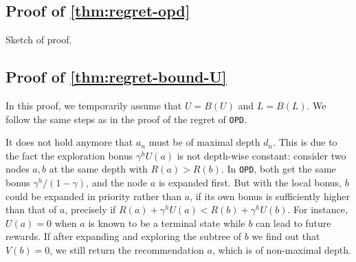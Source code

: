 \documentclass[runningheads]{llncs}
\begin{document}
\subsection{Proof of \autoref{thm:regret-opd}}
Sketch of proof.\\
\noindent{}

\subsection{Proof of \autoref{thm:regret-bound-U}}
In this proof, we temporarily assume that $U=B(U)$ and $L=B(L)$. We follow the same steps as in the proof of the regret of \texttt{OPD}.

\begin{remark}
It does not hold anymore that $a_n$ must be of maximal depth $d_n$.  This is due to the fact the exploration bonus $\gamma^h U(a)$ is not depth-wise constant: consider two nodes $a,b$ at the same depth with $R(a) > R(b)$. In \texttt{OPD}, both get the same bonus $\gamma^h/(1-\gamma)$, and the node $a$ is expanded first. But with the local bonus, $b$ could be expanded in priority rather than $a$, if its own bonus is sufficiently higher than that of $a$, precisely if $R(a)+\gamma^h U(a) < R(b)+\gamma^h U(b)$. For instance, $U(a)=0$ when $a$ is known to be a terminal state while $b$ can lead to future rewards. If after expanding and exploring the subtree of $b$ we find out that $V(b) = 0$, we still return the recommendation $a$, which is of non-maximal depth.
\end{remark}
\end{document}

